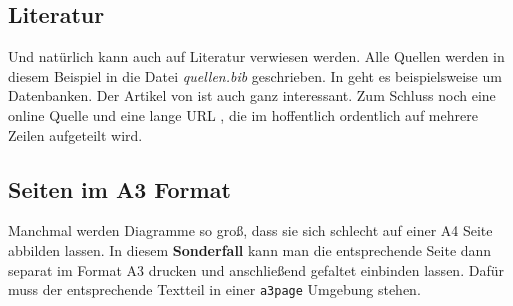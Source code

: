 \subsection{Literatur}

Und natürlich kann auch auf Literatur verwiesen werden.
Alle Quellen werden in diesem Beispiel in die Datei \textit{quellen.bib} geschrieben.
In  \cite{unterstein12} geht es beispielsweise um Datenbanken.
Der Artikel von \citeauthor{goldberg91} \cite{goldberg91} ist auch ganz interessant.
Zum Schluss noch eine online Quelle \cite{wave} und eine lange URL \cite{long}, die im  hoffentlich ordentlich auf mehrere Zeilen aufgeteilt wird.



\begin{a3page}
  \section{Seiten im A3 Format}
  Manchmal werden Diagramme so groß, dass sie sich schlecht auf einer A4 Seite abbilden lassen.
  In diesem \textbf{Sonderfall} kann man die entsprechende Seite dann separat im Format A3 drucken und anschließend gefaltet einbinden lassen.
  Dafür muss der entsprechende Textteil in einer \texttt{a3page} Umgebung stehen.
  \lipsum
\end{a3page}